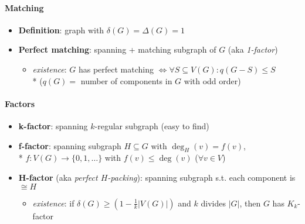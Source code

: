 


\paragraph{Matching}
\begin{itemize}
  \item \textbf{Definition}: graph with $ \delta(G) = \Delta(G) = 1 $ 
  \item \textbf{Perfect matching}: spanning + matching subgraph of $ G $ (aka \emph{1-factor})
  \begin{itemize}
    \item \emph{existence}: $ G $ has perfect matching $ \Leftrightarrow \forall S \subseteq V(G) : q(G-S) \leq S $ \\*
      ($ q(G) = $ number of components in $ G $ with odd order) 
  \end{itemize}
\end{itemize}

\paragraph{Factors}
\begin{itemize}
  \item \textbf{k-factor}: spanning $ k $-regular subgraph (easy to find) 
  \item \textbf{f-factor}: spanning subgraph $ H \subseteq G $ with $ \deg_H(v) = f(v) $, \\*
    $ f: V(G) \to \{ 0,1,\dots \} $ with $ f(v) \leq \deg(v) $ \quad ($ \forall v \in V $)
  \item \textbf{H-factor} (aka \emph{perfect $ H $-packing}): spanning subgraph s.t. each component is $ \cong H $
  \begin{itemize}
    \item \emph{existence}: if $ \delta(G) \geq \left( 1 - \tfrac{1}{k}\vert V(G) \vert \right) $ and $ k $ divides $ \vert G \vert $, then $ G $ has $ K_k $-factor
  \end{itemize}
\end{itemize}

